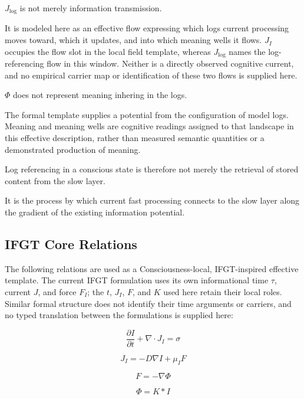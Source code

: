 $J_{\log}$ is not merely information transmission.

It is modeled here as an effective flow expressing which logs current processing moves toward, which it updates, and into which meaning wells it flows. $J_I$ occupies the flow slot in the local field template, whereas $J_{\log}$ names the log-referencing flow in this window. Neither is a directly observed cognitive current, and no empirical carrier map or identification of these two flows is supplied here.

$\Phi$ does not represent meaning inhering in the logs.

The formal template supplies a potential from the configuration of model logs. Meaning and meaning wells are cognitive readings assigned to that landscape in this effective description, rather than measured semantic quantities or a demonstrated production of meaning.

Log referencing in a conscious state is therefore not merely the retrieval of stored content from the slow layer.

It is the process by which current fast processing connects to the slow layer along the gradient of the existing information potential.

\subsection{IFGT Core Relations}


The following relations are used as a Consciousness-local, IFGT-inspired effective template. The current IFGT formulation uses its own informational time $\tau$, current $J$, and force $F_I$; the $t$, $J_I$, $F$, and $K$ used here retain their local roles. Similar formal structure does not identify their time arguments or carriers, and no typed translation between the formulations is supplied here:

\begin{equation}
\frac{\partial I}{\partial t} + \nabla \cdot J_I = \sigma
\end{equation}

\begin{equation}
J_I = -D \nabla I + \mu_I F
\end{equation}

\begin{equation}
F = -\nabla \Phi
\end{equation}

\begin{equation}
\Phi = K * I
\end{equation}

